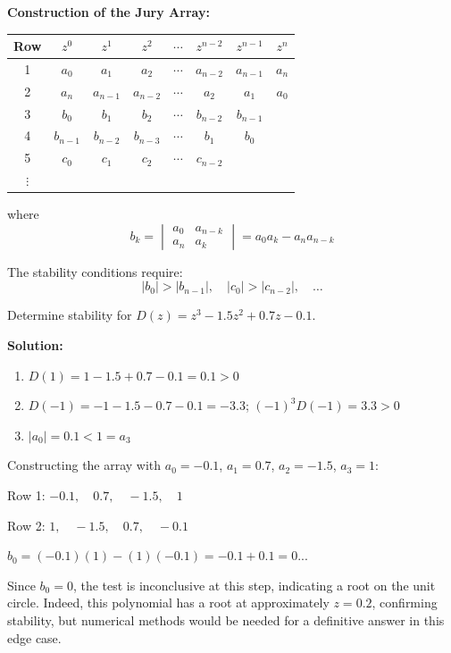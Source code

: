 \textbf{Construction of the Jury Array:}

\begin{center}
\begin{tabular}{c|ccccccc}
Row & $z^0$ & $z^1$ & $z^2$ & $\cdots$ & $z^{n-2}$ & $z^{n-1}$ & $z^n$ \\
\hline
1 & $a_0$ & $a_1$ & $a_2$ & $\cdots$ & $a_{n-2}$ & $a_{n-1}$ & $a_n$ \\
2 & $a_n$ & $a_{n-1}$ & $a_{n-2}$ & $\cdots$ & $a_2$ & $a_1$ & $a_0$ \\
\hline
3 & $b_0$ & $b_1$ & $b_2$ & $\cdots$ & $b_{n-2}$ & $b_{n-1}$ & \\
4 & $b_{n-1}$ & $b_{n-2}$ & $b_{n-3}$ & $\cdots$ & $b_1$ & $b_0$ & \\
\hline
5 & $c_0$ & $c_1$ & $c_2$ & $\cdots$ & $c_{n-2}$ & & \\
$\vdots$ & & & & & & & \\
\end{tabular}
\end{center}

where
\begin{equation}
b_k = \begin{vmatrix} a_0 & a_{n-k} \\ a_n & a_k \end{vmatrix} = a_0 a_k - a_n a_{n-k}
\end{equation}

The stability conditions require:
\begin{equation}
|b_0| > |b_{n-1}|, \quad |c_0| > |c_{n-2}|, \quad \ldots
\end{equation}

\begin{example}
Determine stability for $D(z) = z^3 - 1.5z^2 + 0.7z - 0.1$.

\textbf{Solution:}
\begin{enumerate}
    \item $D(1) = 1 - 1.5 + 0.7 - 0.1 = 0.1 > 0$ \checkmark
    \item $D(-1) = -1 - 1.5 - 0.7 - 0.1 = -3.3$; $(-1)^3 D(-1) = 3.3 > 0$ \checkmark
    \item $|a_0| = 0.1 < 1 = a_3$ \checkmark
\end{enumerate}

Constructing the array with $a_0 = -0.1$, $a_1 = 0.7$, $a_2 = -1.5$, $a_3 = 1$:

Row 1: $-0.1, \quad 0.7, \quad -1.5, \quad 1$

Row 2: $1, \quad -1.5, \quad 0.7, \quad -0.1$

$b_0 = (-0.1)(1) - (1)(-0.1) = -0.1 + 0.1 = 0$...

Since $b_0 = 0$, the test is inconclusive at this step, indicating a root on the unit circle. Indeed, this polynomial has a root at approximately $z = 0.2$, confirming stability, but numerical methods would be needed for a definitive answer in this edge case.
\end{example}

